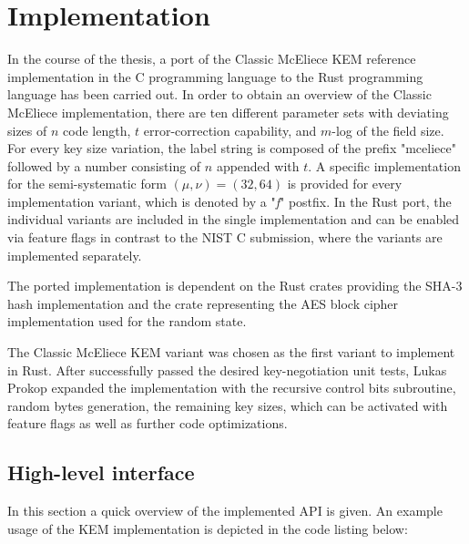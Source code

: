 \documentclass[11pt,
  oneside,openany,    %
]{scrreprt}
\begin{document}
\section{Implementation}
In the course of the thesis, a port of the Classic McEliece KEM reference implementation in the C programming language to the Rust programming language has been carried out. In order to obtain an overview of the Classic McEliece implementation, there are ten different parameter sets with deviating sizes of $n$ code length, $t$ error-correction capability, and $m$-log of the field size. For every key size variation, the label string is composed of the prefix "mceliece" followed by a number consisting of $n$ appended with $t$. A specific implementation for the semi-systematic form $(\mu, \nu) = (32,64)$ is provided for every implementation variant, which is denoted by a "\textit{f}" postfix. In the Rust port, the individual variants are included in the single implementation and can be enabled via feature flags in contrast to the NIST C submission, where the variants are implemented separately.



The ported implementation is dependent on the Rust crates  providing the SHA-3 hash implementation and the  crate representing the AES block cipher implementation used for the random state. 

The Classic McEliece KEM variant  was chosen as the first variant to implement in Rust. After  successfully passed the desired key-negotiation unit tests, Lukas Prokop expanded the implementation with the recursive control bits subroutine, random bytes generation, the remaining key sizes, which can be activated with feature flags as well as further code optimizations.

\subsection{High-level interface}
\label{sec:key_gen}

In this section a quick overview of the implemented API is given. An example usage of the KEM implementation is depicted in the code listing below:
\end{document}
